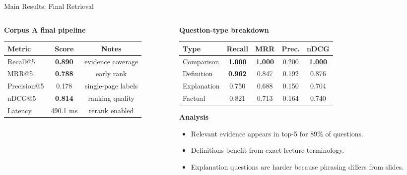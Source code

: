 \documentclass[10pt,aspectratio=169]{beamer}
\begin{document}
\begin{frame}{Main Results: Final Retrieval}
    \begin{columns}[T,totalwidth=\textwidth]
        \begin{column}{0.50\textwidth}
            \textbf{Corpus A final pipeline}
            \small
            \begin{tabular}{lcc}
                \toprule
                Metric & Score & Notes \\
                \midrule
                Recall@5 & \textbf{0.890} & evidence coverage \\
                MRR@5 & \textbf{0.788} & early rank \\
                Precision@5 & 0.178 & single-page labels \\
                nDCG@5 & \textbf{0.814} & ranking quality \\
                Latency & 490.1 ms & rerank enabled \\
                \bottomrule
            \end{tabular}
            \vspace{0.2em}
        \end{column}
        \begin{column}{0.48\textwidth}
            \textbf{Question-type breakdown}
            \scriptsize
            \begin{tabular}{lcccc}
                \toprule
                Type & Recall & MRR & Prec. & nDCG \\
                \midrule
                Comparison & \textbf{1.000} & \textbf{1.000} & 0.200 & \textbf{1.000} \\
                Definition & \textbf{0.962} & 0.847 & 0.192 & 0.876 \\
                Explanation & 0.750 & 0.688 & 0.150 & 0.704 \\
                Factual & 0.821 & 0.713 & 0.164 & 0.740 \\
                \bottomrule
            \end{tabular}
            \vspace{0.5em}
            \normalsize
            \textbf{Analysis}
            \begin{itemize}
                \item Relevant evidence appears in top-5 for 89\% of questions.
                \item Definitions benefit from exact lecture terminology.
                \item Explanation questions are harder because phrasing differs from slides.
            \end{itemize}
        \end{column}
    \end{columns}
\end{frame}
\end{document}
